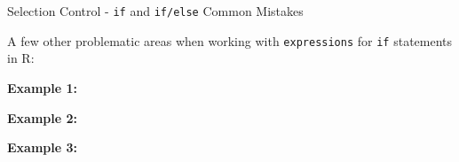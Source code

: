 \begin{frame}[fragile]{Selection Control - \texttt{if} and
\texttt{if/else} Common Mistakes}

A few other problematic areas when working with \texttt{expressions} for
\texttt{if} statements in R:

\textbf{Example 1:}

\begin{Shaded}
\begin{Highlighting}[]
\StringTok{ }\NormalTok{(}\NormalTok{)}
 \NormalTok{||}\StringTok{ }\NormalTok{)}
  \NormalTok{(}\NormalTok{)}
\end{Highlighting}
\end{Shaded}

\textbf{Example 2:}

\begin{Shaded}
\begin{Highlighting}[]
\StringTok{ }\StringTok{ }
\StringTok{ }\NormalTok{) &&}\StringTok{ }\StringTok{ }\NormalTok{)}
  \NormalTok{(}\NormalTok{)}
\end{Highlighting}
\end{Shaded}

\textbf{Example 3:}

\begin{Shaded}
\begin{Highlighting}[]
\StringTok{ }
\StringTok{ } \NormalTok{||}\StringTok{ } \NormalTok{||}\StringTok{ }\NormalTok{)}
  \NormalTok{(}\NormalTok{)}
\end{Highlighting}
\end{Shaded}

\end{frame}

